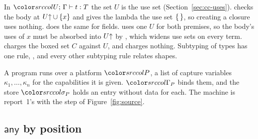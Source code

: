 In $\dtyuj{U}{\Gamma}{t}{T}$ the set $U$ is the use set (Section~\ref{sec:cc-uses}).  checks the body at $U{\uparrow} \cup \{x\}$ and gives the lambda the use set $\{\,\}$, so creating a closure uses nothing.  does the same for fields.  uses one $U$ for both premises, so the body's uses of $x$ must be absorbed into $U{\uparrow}$ by , which widens use sets on every term.  charges the boxed set $C$ against $U$, and  charges nothing. Subtyping of types has one rule, , and every other subtyping rule relates shapes.

A program runs over a platform $\plat$, a list of capture variables $\kappa_1, \ldots, \kappa_n$ for the capabilities it is given. $\platctx$ binds them, and the store $\platstore$ holds an entry without data for each. The machine is report~1's with the step of Figure~\ref{fig:source}.

\subsection{\texorpdfstring{$\mathsf{any}$}{any} by position}\label{sec:source-any}

